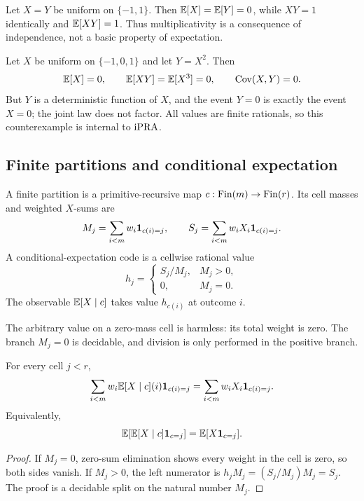 \begin{example}\label{ex:not-multiplicative}
Let \(X=Y\) be uniform on \(\{-1,1\}\).  Then
\(\mathbb E[X]=\mathbb E[Y]=0\), while \(XY=1\) identically and \(\mathbb E[XY]=1\).
Thus multiplicativity is a consequence of independence, not a basic property
of expectation.
\end{example}

\begin{example}\label{ex:uncorrelated}
Let \(X\) be uniform on \(\{-1,0,1\}\) and let \(Y=X^2\).  Then
\[
 \mathbb E[X]=0,
 \qquad \mathbb E[XY]=\mathbb E[X^3]=0,
 \qquad \operatorname{Cov}(X,Y)=0.
\]
But \(Y\) is a deterministic function of \(X\), and the event \(Y=0\) is
exactly the event \(X=0\); the joint law does not factor.  All values are
finite rationals, so this counterexample is internal to \(\mathrm{iPRA}\).
\end{example}

\subsection{Finite partitions and conditional expectation}

\begin{definition}\label{def:partition}
A finite partition is a primitive-recursive map
\(c:\operatorname{Fin}(m)\to\operatorname{Fin}(r)\).  Its cell masses and weighted \(X\)-sums are
\[
 M_j=\sum_{i<m}w_i\mathbf 1_{c(i)=j},\qquad
 S_j=\sum_{i<m}w_iX_i\mathbf 1_{c(i)=j}.
\]
A conditional-expectation code is a cellwise rational value
\[
 h_j=\begin{cases}S_j/M_j,&M_j>0,\\0,&M_j=0.\end{cases}
\]
The observable \(\mathbb E[X\mid c]\) takes value \(h_{c(i)}\) at outcome \(i\).
\end{definition}

The arbitrary value on a zero-mass cell is harmless: its total weight is zero.
The branch \(M_j=0\) is decidable, and division is only performed in the
positive branch.

\begin{theorem}\label{thm:cell-characterization}
For every cell \(j<r\),
\[
 \sum_{i<m}w_i\mathbb E[X\mid c](i)\mathbf 1_{c(i)=j}
 =\sum_{i<m}w_iX_i\mathbf 1_{c(i)=j}.
\]
Equivalently,
\[
 \mathbb E[\mathbb E[X\mid c]\mathbf 1_{c=j}]=\mathbb E[X\mathbf 1_{c=j}].
\]
\end{theorem}

\begin{proof}
If \(M_j=0\), zero-sum elimination shows every weight in the cell is zero, so
both sides vanish.  If \(M_j>0\), the left numerator is
\(h_jM_j=(S_j/M_j)M_j=S_j\).  The proof is a decidable split on the natural
number \(M_j\).
\end{proof}

